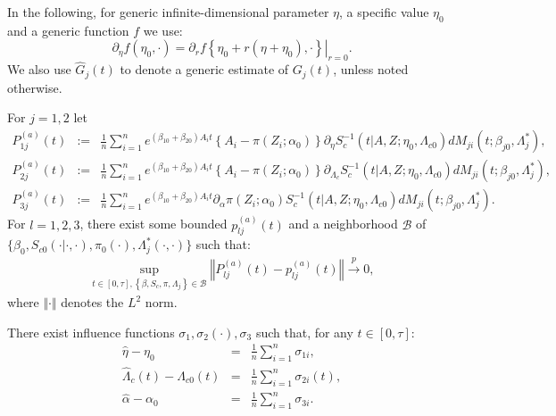 \documentclass[11pt]{article}
\newcommand{\eqnn}{\begin{eqnarray*}}
\newcommand{\een}{\end{eqnarray*}}
\begin{document}
In the following, for generic infinite-dimensional parameter $\eta$, a specific value $\eta_0$ and a generic function $f$ we use:
$$
\partial_{\eta}f(\eta_0, \cdot)=\partial_r \left.f\left\{\eta_0 +r(\eta + \eta_0) , \cdot\right\}\right|_{r=0}.
$$
We also use $\hat G_j(t)$ to denote a generic estimate of $G_j(t)$, unless noted otherwise.
\begin{assumptionA}\label{convn}
For $j=1,2$ let
\eqnn
P^{(a)}_{1j}(t) &:=& \frac{1}{n}\sum_{i=1}^n e^{(\beta_{10}+\beta_{20})A_it}\left\{A_i-\pi(Z_i ; \alpha_0)\right\}\partial_{\eta}S_c^{-1}(t | A,Z ; \eta_0, \Lambda_{c0})dM_{ji}(t; \beta_{j0}, \Lambda^{*}_j),\\
P^{(a)}_{2j}(t) &:=&\frac{1}{n}\sum_{i=1}^n e^{(\beta_{10}+\beta_{20})A_it}\left\{A_i-\pi(Z_i ; \alpha_0)\right\}\partial_{\Lambda_c}S_c^{-1}(t | A,Z ; \eta_0, \Lambda_{c0})dM_{ji}(t; \beta_{j0}, \Lambda^{*}_j),\\
P^{(a)}_{3j}(t) &:=& \frac{1}{n}\sum_{i=1}^n e^{(\beta_{10}+\beta_{20})A_it}\partial_\alpha \pi(Z_i ; \alpha_0)S_c^{-1}(t | A,Z ; \eta_0, \Lambda_{c0})dM_{ji}(t; \beta_{j0}, \Lambda^{*}_j).
\een
For $l=1,2,3$, there exist some bounded $p^{(a)}_{lj}(t)$ and a neighborhood $\mathcal{B}$ of  \\$\{\beta_0,S_{c0}(\cdot | \cdot,\cdot),\pi_0(\cdot), \Lambda^{*}_j(\cdot,\cdot)\}$
 such that:
\eqnn
\sup_{t \in [0,\tau], \left\{\beta,S_c, \pi, \Lambda_j\right\} \in \mathcal{B}} \left\Vert P^{(a)}_{lj}(t)-p^{(a)}_{lj}(t)\right\Vert\overset{p}{\rightarrow} 0,
\een
where  $\Vert \cdot \Vert$ denotes the $L^2$ norm.
\end{assumptionA}

\begin{assumptionA}\label{ifc}
There exist influence functions $\sigma_{1},\sigma_2(\cdot),\sigma_3$ such that, for any $t \in [0,\tau]$:
\eqnn
\hat\eta-\eta_0 &=& \frac{1}{n}\sum_{i=1}^n \sigma_{1i},\\
\hat\Lambda_c(t)-\Lambda_{c0}(t) &=& \frac{1}{n}\sum_{i=1}^n \sigma_{2i}(t),\\
\hat\alpha-\alpha_0 &=& \frac{1}{n}\sum_{i=1}^n \sigma_{3i}.
\een
\end{assumptionA}
\end{document}
